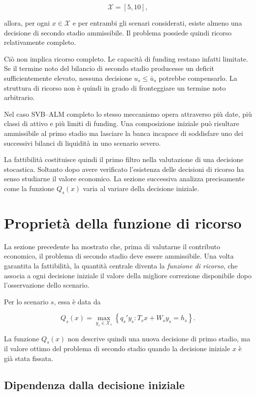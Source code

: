 \[
\mathcal X=[5,10],
\]

allora, per ogni $x\in\mathcal X$ e per entrambi gli scenari considerati,
esiste almeno una decisione di secondo stadio ammissibile. Il problema
possiede quindi ricorso relativamente completo.

Ci\`o non implica ricorso completo. Le capacit\`a di funding restano infatti
limitate. Se il termine noto del bilancio di secondo stadio producesse un
deficit sufficientemente elevato, nessuna decisione $u_s\leq\bar u_s$ potrebbe
compensarlo. La struttura di ricorso non \`e quindi in grado di fronteggiare
un termine noto arbitrario.

Nel caso SVB--ALM completo lo stesso meccanismo opera attraverso pi\`u date,
pi\`u classi di attivo e pi\`u limiti di funding. Una composizione iniziale
pu\`o risultare ammissibile al primo stadio ma lasciare la banca incapace di
soddisfare uno dei successivi bilanci di liquidit\`a in uno scenario severo.

La fattibilit\`a costituisce quindi il primo filtro nella valutazione di una
decisione stocastica. Soltanto dopo avere verificato l'esistenza delle
decisioni di ricorso ha senso studiarne il valore economico. La sezione
successiva analizza precisamente come la funzione $Q_s(x)$ varia al variare
della decisione iniziale.

\section{Propriet\`a della funzione di ricorso}

\label{sec:cap15-proprieta-funzione-ricorso}

La sezione precedente ha mostrato che, prima di valutarne il contributo
economico, il problema di secondo stadio deve essere ammissibile. Una volta
garantita la fattibilit\`a, la quantit\`a centrale diventa la \emph{funzione di
ricorso}, che associa a ogni decisione iniziale il valore della migliore
correzione disponibile dopo l'osservazione dello scenario.

Per lo scenario $s$, essa \`e data da

\[
Q_s(x)
=
\max_{y_s\in\mathcal X_s}
\left\{
q_s'y_s:
T_sx+W_sy_s=h_s
\right\}.
\]

La funzione $Q_s(x)$ non descrive quindi una nuova decisione di primo stadio,
ma il valore ottimo del problema di secondo stadio quando la decisione iniziale
$x$ \`e gi\`a stata fissata.

\subsection{Dipendenza dalla decisione iniziale}

